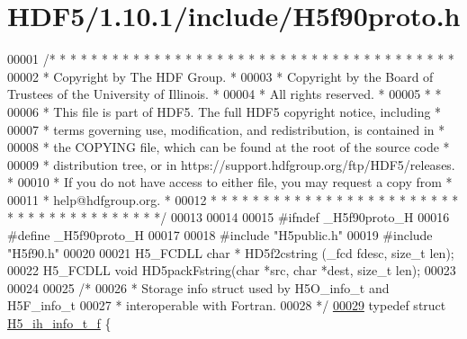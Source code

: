 \hypertarget{_h_d_f5_21_810_81_2include_2_h5f90proto_8h_source}{}\section{H\+D\+F5/1.10.1/include/\+H5f90proto.h}
\label{_h_d_f5_21_810_81_2include_2_h5f90proto_8h_source}

\begin{DoxyCode}
00001 \textcolor{comment}{/* * * * * * * * * * * * * * * * * * * * * * * * * * * * * * * * * * * * * * *}
00002 \textcolor{comment}{ * Copyright by The HDF Group.                                               *}
00003 \textcolor{comment}{ * Copyright by the Board of Trustees of the University of Illinois.         *}
00004 \textcolor{comment}{ * All rights reserved.                                                      *}
00005 \textcolor{comment}{ *                                                                           *}
00006 \textcolor{comment}{ * This file is part of HDF5.  The full HDF5 copyright notice, including     *}
00007 \textcolor{comment}{ * terms governing use, modification, and redistribution, is contained in    *}
00008 \textcolor{comment}{ * the COPYING file, which can be found at the root of the source code       *}
00009 \textcolor{comment}{ * distribution tree, or in https://support.hdfgroup.org/ftp/HDF5/releases.  *}
00010 \textcolor{comment}{ * If you do not have access to either file, you may request a copy from     *}
00011 \textcolor{comment}{ * help@hdfgroup.org.                                                        *}
00012 \textcolor{comment}{ * * * * * * * * * * * * * * * * * * * * * * * * * * * * * * * * * * * * * * */}
00013 
00014 
00015 \textcolor{preprocessor}{#ifndef \_H5f90proto\_H}
00016 \textcolor{preprocessor}{#define \_H5f90proto\_H}
00017 
00018 \textcolor{preprocessor}{#include "H5public.h"}
00019 \textcolor{preprocessor}{#include "H5f90.h"}
00020 
00021 H5\_FCDLL \textcolor{keywordtype}{char} * HD5f2cstring (\_fcd fdesc, \textcolor{keywordtype}{size\_t} len);
00022 H5\_FCDLL \textcolor{keywordtype}{void} HD5packFstring(\textcolor{keywordtype}{char} *src, \textcolor{keywordtype}{char} *dest, \textcolor{keywordtype}{size\_t} len);
00023 
00024 
00025 \textcolor{comment}{/*}
00026 \textcolor{comment}{ * Storage info struct used by H5O\_info\_t and H5F\_info\_t }
00027 \textcolor{comment}{ * interoperable with Fortran.}
00028 \textcolor{comment}{ */}
\hyperlink{struct_h5__ih__info__t__f}{00029} \textcolor{keyword}{typedef} \textcolor{keyword}{struct }\hyperlink{struct_h5__ih__info__t__f}{H5\_ih\_info\_t\_f} \{

\end{DoxyCode}
